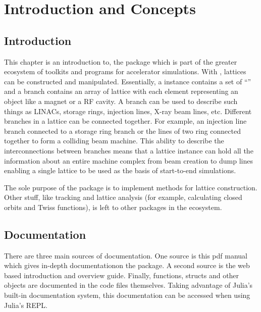 \chapter{Introduction and Concepts}

\section{Introduction}

This chapter is an introduction to, the \accellat package which is part of the
greater \bmadjl ecosystem of toolkits and programs for accelerator simulations. With \accellat,
lattices can be constructed and manipulated. Essentially, a  instance contains
a set of ``'' and a branch contains 
an array of lattice  with each element representing an object like a magnet
or a RF cavity. A branch can be used to describe such
things as LINACs, storage rings, injection lines, X-ray beam lines, etc. Different branches in a
lattice can be connected together. For example, an injection line branch connected to a storage
ring branch or the lines of two ring connected together to form a colliding beam machine. 
This ability to describe the interconnections between branches means that 
a lattice instance can hold all the information about an entire machine complex from beam creation
to dump lines enabling a single lattice to be used as the basis of start-to-end simulations.

The sole purpose of the \accellat package is to implement methods for lattice construction.
Other stuff, like tracking and lattice analysis (for example, calculating
closed orbits and Twiss functions), is left to other packages in the \bmadjl ecosystem.

\section{Documentation}

There are three main sources of documentation. One source is this pdf manual which gives in-depth
documentationon the \accellat package. A second source is the web based introduction and overview guide.
Finally, functions, structs and other objects are documented in the code files themselves. 
Taking advantage of Julia's built-in documentation system, this documentation can be accessed
when using Julia's REPL.


